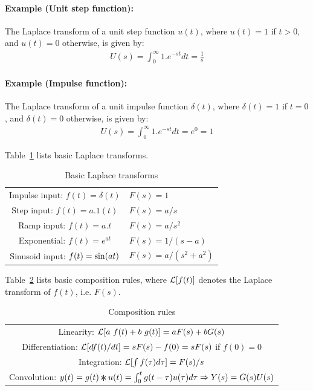 \documentclass{article}
\def\L{{\cal L}}
\def\sn{{\rm sin}}
\newcommand{\Conv}{\mathop{\scalebox{1.5}{\raisebox{-0.2ex}{$\ast$}}}}%
\begin{document}
\paragraph{Example (Unit step function):}
The Laplace transform of a unit step function $u(t)$, where $u(t) = 1$ if $t > 0$, and $u(t) = 0$ otherwise, is given by:
\begin{eqnarray*}
U(s) = \int_0^{\infty} 1 . e^{-st} dt = \frac{1}{s}
\end{eqnarray*}


\paragraph{Example (Impulse function):}
The Laplace transform of a unit impulse function $\delta(t)$, where $\delta(t) = 1$ if $t = 0$, and $\delta(t) = 0$ otherwise, is given by:
\begin{eqnarray*}
U(s) = \int_0^{\infty} 1 . e^{-st} dt = e^{0} = 1
\end{eqnarray*}
 
Table~\ref{tab:transforms} lists basic Laplace transforms.
\begin{table}[htdp]
\caption{Basic Laplace transforms}
\begin{center}
\begin{tabular}{|c|l|} \hline
Impulse input:	$f(t) = \delta(t)$ & $F(s) = 1$ \\ [2ex]
Step input: 	$f(t) = a.1(t)$	& $F(s) = a/s$ \\[2ex]
Ramp input: 	$f(t) = a.t$		& $F(s) = a/s^2$ \\[2ex]
Exponential:	$f(t) = e^{at}$	& $F(s) = 1/(s-a)$ \\[2ex]
Sinusoid input:	$f(t) = \sn(at)$	& $F(s) = a/(s^2+a^2)$ \\ [2ex]\hline
\end{tabular}
\end{center}
\label{tab:transforms}
\end{table}%

Table~\ref{tab:composition} lists basic composition rules, 
where $\L[f(t)]$ denotes the Laplace transform of $f(t)$, i.e. $F(s)$.
\begin{table}[htdp]
\caption{Composition rules}
\begin{center}
\begin{tabular}{|c|} \hline 
Linearity:	$\L[a\ f(t) + b\ g(t)] = a F(s) + b G(s)$ \\[2ex]
Differentiation: $\L[df(t)/dt] =  sF(s) - f(0) = sF(s)$ if $f(0) = 0$ \\[2ex]
Integration: $\L[\int f(\tau) d\tau] = F(s)/s$ \\[2ex]
Convolution: $y(t) = g(t) \Conv u(t) = \int_0^{t} g(t-\tau) u(\tau) d \tau \Rightarrow Y(s) = G(s) U(s)$ \\ [2ex] \hline
\end{tabular}
\end{center}
\label{default}
\label{tab:composition} 
\end{table}%
\end{document}
